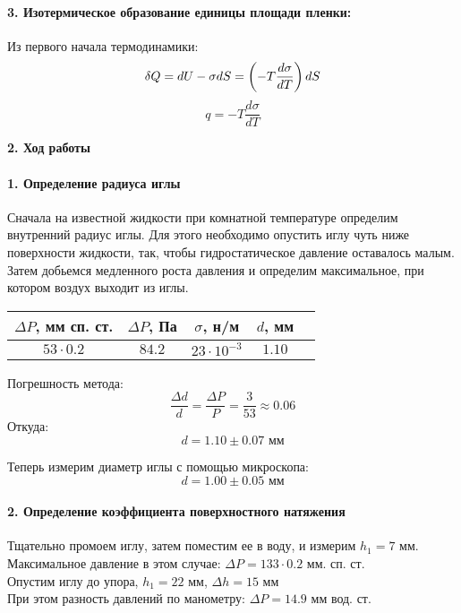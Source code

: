 \documentclass[12pt,a4paper]{article}
\begin{document}
\paragraph{3. Изотермическое образование единицы площади пленки:}
Из первого начала термодинамики: 
\begin{equation}
\delta Q = d U - \sigma d S = \left( - T \frac{d \sigma}{dT} \right)  dS \\
\end{equation}
\[q = - T \frac{d \sigma}{dT}\]
\newpage
\begin{Large}
\begin{center}
\textbf{2. Ход работы}\\
\end{center}
\end{Large}
\paragraph{1. Определение радиуса иглы}

Сначала на известной жидкости при комнатной температуре определим внутренний радиус иглы. Для этого необходимо опустить иглу чуть ниже поверхности жидкости, так, чтобы гидростатическое давление оставалось малым. Затем добьемся медленного роста давления и определим максимальное, при котором воздух выходит из иглы.
\begin{center}
\begin{large}
\begin{tabular}{ccc|cc}
 
  $\Delta P$, мм сп. ст.& $\Delta P$, Па & $\sigma$, н/м & $d$, мм \\ 
  \hline 
  $53 \cdot 0.2$& $84.2$ & $23 \cdot 10^{-3}$ & $1.10$ \\ 
  \end{tabular}   
\end{large}
\end{center}
Погрешность метода: 
\[\frac{\Delta d}{d} = \frac{\Delta P}{P}  = \frac{3}{53} \approx 0.06\]
Откуда:
{\large \[ d = 1.10 \pm 0.07 \text{ мм} \]}


Теперь измерим диаметр иглы с помощью микроскопа:\\
{\large \[d = 1.00 \pm 0.05 \text{ мм} \]}

\paragraph{2. Определение коэффициента поверхностного натяжения}


Тщательно промоем иглу, затем поместим ее в воду, и измерим $h_1 = 7 \text{ мм}$. Максимальное давление в этом случае: $\Delta P  =  133 \cdot 0.2 \text{ мм. сп. ст.}$\\
Опустим иглу до упора, $h_1 = 22 \text{ мм}$, $\Delta h = 15 \text{ мм}$\\
При этом разность давлений по манометру: $\Delta P = 14.9  \text{ мм вод. ст.} $\\
\end{document}
